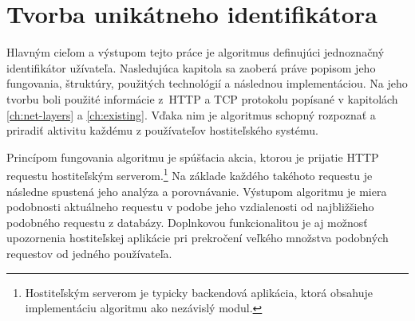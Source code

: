 \documentclass[
  digital, %
  table,   %
  lof,     %
  nolot,   %
  nocover
]{fithesis3}
\begin{document}
\chapter{Tvorba unikátneho identifikátora}
\label{ch:footprint}
Hlavným cieľom a výstupom tejto práce je algoritmus definujúci jednoznačný
identifikátor užívateľa. Nasledujúca kapitola sa zaoberá práve popisom jeho
fungovania, štruktúry, použitých technológií a následnou implementáciou. Na
jeho tvorbu boli použité informácie z~HTTP a TCP protokolu popísané v
kapitolách \ref{ch:net-layers} a \ref{ch:existing}. Vďaka nim je algoritmus
schopný rozpoznať a priradiť aktivitu každému z používateľov hostiteľského
systému.

Princípom fungovania algoritmu je spúšťacia akcia, ktorou je prijatie HTTP requestu
hostiteľským serverom.\footnote{Hostiteľským serverom je typicky backendová
aplikácia, ktorá obsahuje implementáciu algoritmu ako nezávislý modul.} Na
základe každého takéhoto requestu je následne spustená jeho analýza a
porovnávanie. Výstupom algoritmu je miera podobnosti aktuálneho
requestu v podobe jeho vzdialenosti od najbližšieho podobného requestu
z databázy. Doplnkovou funkcionalitou je aj možnosť upozornenia hostiteľskej
aplikácie pri prekročení veľkého množstva podobných requestov od jedného používateľa.
\end{document}

